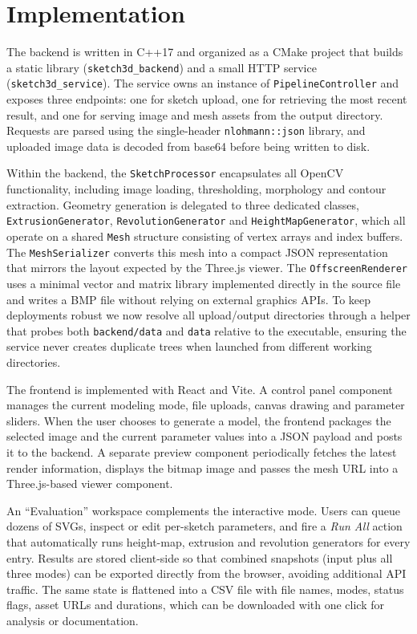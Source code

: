\documentclass[11pt, a4paper]{article}
\begin{document}
\section{Implementation}
The backend is written in C++17 and organized as a CMake project that builds a static library (\texttt{sketch3d\_backend}) and a small HTTP service (\texttt{sketch3d\_service}). The service owns an instance of \texttt{PipelineController} and exposes three endpoints: one for sketch upload, one for retrieving the most recent result, and one for serving image and mesh assets from the output directory. Requests are parsed using the single-header \texttt{nlohmann::json} library, and uploaded image data is decoded from base64 before being written to disk.

Within the backend, the \texttt{SketchProcessor} encapsulates all OpenCV functionality, including image loading, thresholding, morphology and contour extraction. Geometry generation is delegated to three dedicated classes, \texttt{ExtrusionGenerator}, \texttt{RevolutionGenerator} and \texttt{HeightMapGenerator}, which all operate on a shared \texttt{Mesh} structure consisting of vertex arrays and index buffers. The \texttt{MeshSerializer} converts this mesh into a compact JSON representation that mirrors the layout expected by the Three.js viewer. The \texttt{OffscreenRenderer} uses a minimal vector and matrix library implemented directly in the source file and writes a BMP file without relying on external graphics APIs. To keep deployments robust we now resolve all upload/output directories through a helper that probes both \texttt{backend/data} and \texttt{data} relative to the executable, ensuring the service never creates duplicate trees when launched from different working directories.

The frontend is implemented with React and Vite. A control panel component manages the current modeling mode, file uploads, canvas drawing and parameter sliders. When the user chooses to generate a model, the frontend packages the selected image and the current parameter values into a JSON payload and posts it to the backend. A separate preview component periodically fetches the latest render information, displays the bitmap image and passes the mesh URL into a Three.js-based viewer component.

An ``Evaluation'' workspace complements the interactive mode. Users can queue dozens of SVGs, inspect or edit per-sketch parameters, and fire a \emph{Run All} action that automatically runs height-map, extrusion and revolution generators for every entry. Results are stored client-side so that combined snapshots (input plus all three modes) can be exported directly from the browser, avoiding additional API traffic. The same state is flattened into a CSV file with file names, modes, status flags, asset URLs and durations, which can be downloaded with one click for analysis or documentation.
\end{document}
